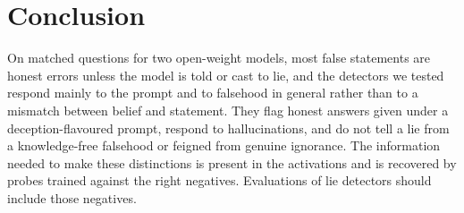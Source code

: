 \section{Conclusion}

On matched questions for two open-weight models, most false statements are honest errors unless the model is told or cast to lie, and the detectors we tested respond mainly to the prompt and to falsehood in general rather than to a mismatch between belief and statement. They flag honest answers given under a deception-flavoured prompt, respond to hallucinations, and do not tell a lie from a knowledge-free falsehood or feigned from genuine ignorance. The information needed to make these distinctions is present in the activations and is recovered by probes trained against the right negatives. Evaluations of lie detectors should include those negatives.
